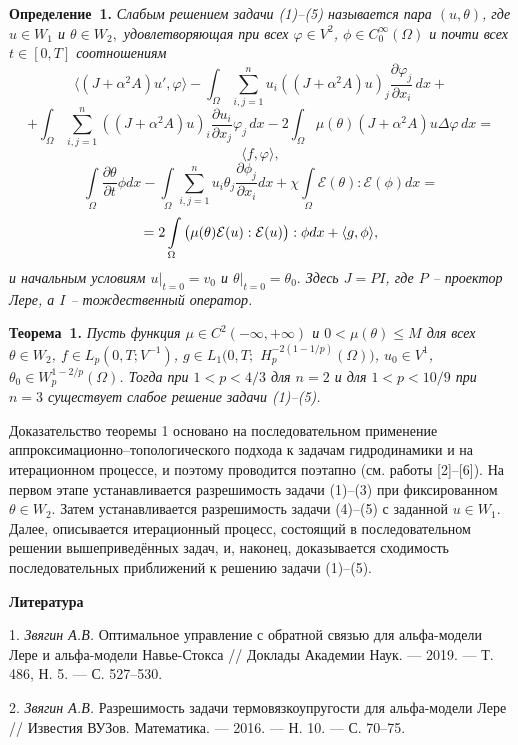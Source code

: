 \textbf{Определение~1.} {\it
	Слабым решением задачи (1)--(5) называется пара $(u, \theta)$, где $u \in W_1$ и $\theta \in W_2,$ удовлетворяющая при всех $\varphi \in V^2$, $ \phi \in C^{\infty}_0(\Omega)$ и почти всех $t\in [0,T]$ соотношениям
$$
	\langle (J+\alpha^2A)u', \varphi\rangle - \int_\Omega\sum_{i, j=1}^nu_i((J+\alpha^2A)u)_j
	\frac{\partial\varphi_j}{\partial x_i}\,dx +$$
	$$+ \int_\Omega\sum_{i, j=1}^n((J+\alpha^2A)u)_i\frac{\partial u_i}{\partial x_j}
	\varphi_j\,dx
	- 2\int_\Omega \mu(\theta) (J+\alpha^2A)u\Delta\varphi\,dx=$$
	$$
	\langle f, \varphi\rangle,$$ $$
	\int\limits_\Omega \frac{\partial\theta}{\partial t}\phi dx-\int\limits_\Omega\sum\limits_{i,j=1}^n
	u_i\theta_j\frac{\partial \phi_j}{\partial x_i} dx+\chi\int\limits_\Omega
	\mathcal{E}(\theta):\mathcal{E}( \phi) dx=$$ $$= 2\int\limits_\Omega\big{(}{\mu}(\theta) \mathcal {E}(u): \mathcal {E}(u)\big{)}:\phi dx+\langle g,\phi\rangle,\label{f4}
$$
	и начальным условиям $u|_{t=0} = v_0$ и $\theta|_{t=0}=\theta_0.$ Здесь $J=PI$, где $P$ -- проектор Лере, а $I$ -- тождественный оператор.}

\textbf{Теорема~1.} {\it Пусть функция $\mu \in C^2(-\infty,+\infty)$ и $0<\mu(\theta)\leq M$ для всех $\theta \in W_2$, $f \in L_p(0,T;V^{-1})$, $g \in L_1(0,T;$ $H^{-2(1-1/p)}_p(\Omega))$, $u_0 \in V^1$, $\theta_0 \in W^{1-2/p}_p(\Omega)$. Тогда при $1<p<4/3$ для $n=2$ и для $1<p<10/9$ при $n=3$ существует слабое решение задачи (1)--(5).}

Доказательство теоремы 1 основано на последовательном применение аппроксимационно--топологического подхода к задачам гидродинамики и на итерационном процессе, и поэтому проводится поэтапно (см. работы [2]--[6]). На первом этапе устанавливается разрешимость задачи (1)--(3) при фиксированном $\theta \in W_2$. Затем устанавливается разрешимость задачи (4)--(5) с заданной $u \in W_1$. Далее, описывается итерационный процесс, состоящий в последовательном решении вышеприведённых задач, и, наконец, доказывается сходимость последовательных приближений к решению задачи (1)--(5).




\smallskip \centerline {\bf Литература} \nopagebreak

1. {\it Звягин А.В.} Оптимальное управление с обратной связью для альфа-модели Лере и альфа-модели Навье-Стокса // Доклады Академии Наук. --- 2019. --- Т. 486, Н. 5. --- С. 527--530.

2. {\it Звягин А.В.} Разрешимость задачи термовязкоупругости для альфа-модели Лере // Известия ВУЗов. Математика. --- 2016. --- Н. 10. --- С. 70--75.

